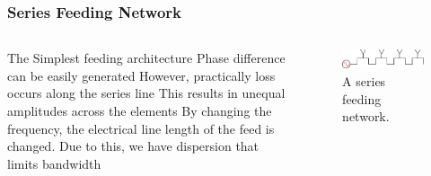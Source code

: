 \documentclass[10pt]{beamer}
\begin{document}
\begin{frame}
    \frametitle{Series Feeding Network}
    \begin{columns}[] %
        \begin{column}{.6\textwidth}
            \begin{outline}
                \1 The Simplest feeding architecture
                \2 Phase difference can be easily generated
                \1 However, practically loss occurs along the series line
                \2 This results in unequal amplitudes across the elements
                \1 By changing the frequency, the electrical line length of the feed is changed.
                \2 Due to this, we have dispersion that limits bandwidth
            \end{outline}   
        \end{column}
        \begin{column}{.4\textwidth}
            \begin{figure}[h!]
                \centering
                \includegraphics[width=.8\textwidth]{series.pdf}
                \caption{A series feeding network.}
            \end{figure}
        \end{column}%
    \end{columns}
\end{frame}
\end{document}
